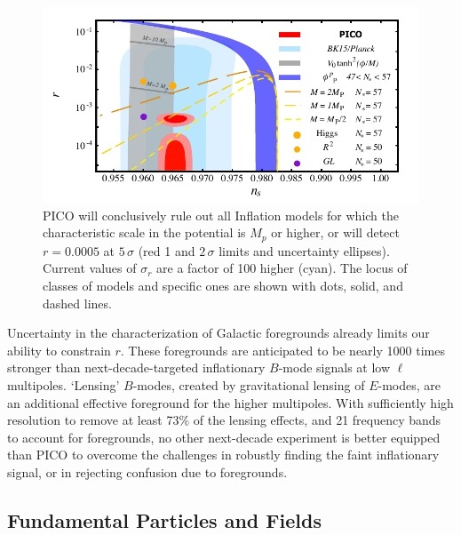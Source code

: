 \documentclass[PICOAPC.tex]{subfiles}
\begin{document}
\begin{figure}[!thb]
\hspace{-0.13in}
\parbox{4.4in}{\centerline{
\includegraphics[width=4.5in]{figures/nsrlabeledrp0005_PICOv6.pdf} } }
\parbox{2.1in}{
\caption{\captiontext  PICO will conclusively rule out all Inflation models for which the characteristic scale in the potential is $M_{p}$ or higher, or will detect $r=0.0005$ at $5\, \sigma$ (red 1 and $2\,\sigma$ limits and uncertainty ellipses). Current values of $\sigma_{r}$ are a factor of 100 higher (cyan). 
The locus of classes of models and specific ones are shown with dots, solid, and dashed lines. }
\label{fig:nsr}}
\vspace{-0.16in}
\end{figure}

Uncertainty in the characterization of Galactic foregrounds already limits our ability to constrain $r$. These foregrounds 
are anticipated to be nearly 1000 times stronger than next-decade-targeted inflationary $B$-mode signals at low $\ell$ multipoles. %
`Lensing' $B$-modes, created by gravitational lensing of $E$-modes, are an additional effective foreground for the higher multipoles. With sufficiently high resolution to remove at least 73\% of the lensing effects, and 21 frequency bands to account for foregrounds, no other next-decade experiment is better equipped than PICO to overcome the challenges in robustly finding the faint inflationary signal, or in rejecting confusion due to foregrounds. 

\vspace{-0.05in}

\subsection{Fundamental Particles and Fields} %
\label{sec:relics_neutrinos}

\end{document}

